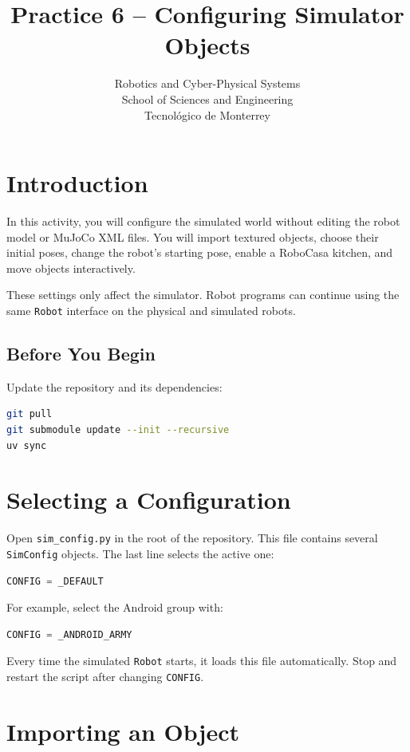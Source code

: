\documentclass[11pt,a4paper]{article}
\title{\textbf{Practice 6 -- Configuring Simulator Objects}}
\author{
    Robotics and Cyber-Physical Systems \\
    School of Sciences and Engineering \\
    Tecnol\'ogico de Monterrey
}
\date{}
\begin{document}
\maketitle

\section*{Introduction}

In this activity, you will configure the simulated world without editing the
robot model or MuJoCo XML files. You will import textured objects, choose their
initial poses, change the robot's starting pose, enable a RoboCasa kitchen, and
move objects interactively.

These settings only affect the simulator. Robot programs can continue using
the same \texttt{Robot} interface on the physical and simulated robots.

\subsection*{Before You Begin}

Update the repository and its dependencies:

\begin{lstlisting}[language=bash]
git pull
git submodule update --init --recursive
uv sync
\end{lstlisting}

\section{Selecting a Configuration}

Open \texttt{sim\_config.py} in the root of the repository. This file contains
several \texttt{SimConfig} objects. The last line selects the active one:

\begin{lstlisting}[language=Python]
CONFIG = _DEFAULT
\end{lstlisting}

For example, select the Android group with:

\begin{lstlisting}[language=Python]
CONFIG = _ANDROID_ARMY
\end{lstlisting}

Every time the simulated \texttt{Robot} starts, it loads this file
automatically. Stop and restart the script after changing \texttt{CONFIG}.

\section{Importing an Object}
\end{document}
